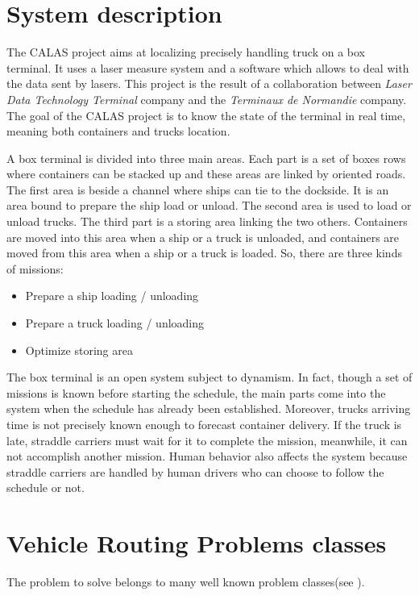\documentclass[a4paper,10pt]{article}
\begin{document}
\begin{multicols}{2}
	
	\section*{System description}
		The CALAS project aims at localizing precisely handling truck on a box terminal. It uses a laser measure system and a software which allows to deal with the data sent by lasers. This project is the result of a collaboration between \textit{Laser Data Technology Terminal} company and the \textit{Terminaux de Normandie} company. The goal of the CALAS project is to know the state of the terminal in real time, meaning both containers and trucks location.
	
		A box terminal is divided into three main areas. Each part is a set of boxes rows where containers can be stacked up and these areas are linked by oriented roads. The first area is beside a channel where ships can tie to the dockside. It is an area bound to prepare the ship load or unload. The second area is used to load or unload trucks. The third part is a storing area linking the two others. Containers are moved into this area when a ship or a truck is unloaded, and containers are moved from this area when a ship or a truck is loaded. So, there are three kinds of missions:
		\begin{itemize}                                                                                                                    	\item Prepare a ship loading / unloading
			\item Prepare a truck loading / unloading
			\item Optimize storing area
		\end{itemize}
		
		The box terminal is an open system subject to dynamism. In fact, though a set of missions is known before starting the schedule, the main parts come into the system when the schedule has already been established. Moreover, trucks arriving time is not precisely known enough to forecast container delivery. If the truck is late, straddle carriers must wait for it to complete the mission, meanwhile, it can not accomplish another mission. Human behavior also affects the system because straddle carriers are handled by human drivers who can choose to follow the schedule or not.

	\section*{Vehicle Routing Problems classes}
 		The problem to solve belongs to many well known problem classes(see \cite{Larsen00}).


\end{multicols}
\end{document}
